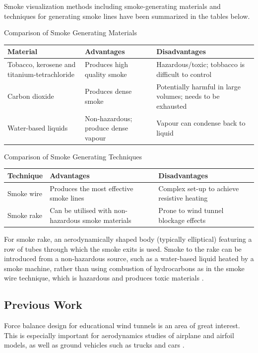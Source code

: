 Smoke visualization methods including smoke-generating materials and techniques for generating smoke lines have been summarized in the tables below.
\begin{center}
	\begin{table}[H]
		\caption[Smoke Generating Materials]{Comparison of Smoke Generating Materials}
		\end{table}
	\begin{tabular}{|p{5cm}|p{5cm}|p{5cm}|}
	\hline
	\textbf{Material} & \textbf{Advantages} & \textbf{Disadvantages}\\
	\hline
	Tobacco, kerosene and titanium-tetrachloride & Produces high quality smoke & Hazardous/toxic; tobbacco is difficult to control\\
	\hline
	Carbon dioxide & Produces dense smoke & Potentially harmful in large volumes; needs to be exhausted\\
	\hline
	Water-based liquids & Non-hazardous; produce dense vapour & Vapour can condense back to liquid\\
	\hline
	\end{tabular}
	\end{center}

	\begin{center}
		\begin{table}[H]
			\caption[Smoke Generating Techniques]{Comparison of Smoke Generating Techniques}
			\end{table}
		\begin{tabular}{|p{5cm}|p{5cm}|p{5cm}|}
			\hline
			\textbf{Technique} & \textbf{Advantages} & \textbf{Disadvantages}\\
			\hline
			Smoke wire & Produces the most effective smoke lines & Complex set-up to achieve resistive heating\\
			\hline
			Smoke rake & Can be utilised with non-hazardous smoke materials & Prone to wind tunnel blockage effects\\
			\hline
		\end{tabular}
	\end{center}
	For smoke rake, an aerodynamically shaped
	body (typically elliptical) featuring a row of tubes through which the smoke exits is used. Smoke to the rake can be introduced from a non-hazardous source, 
	such as a water-based liquid heated by a 
	smoke machine, rather than using combustion of hydrocarbons as in the smoke wire technique, which is hazardous and produces toxic materials \cite{trinder2013development}.

\subsection{Previous Work}
Force balance design for educational wind tunnels is an area of great interest. This is especially important
for aerodynamics studies of airplane and airfoil models, as well as ground vehicles such as trucks
and cars \cite{morris_force_2010}.

